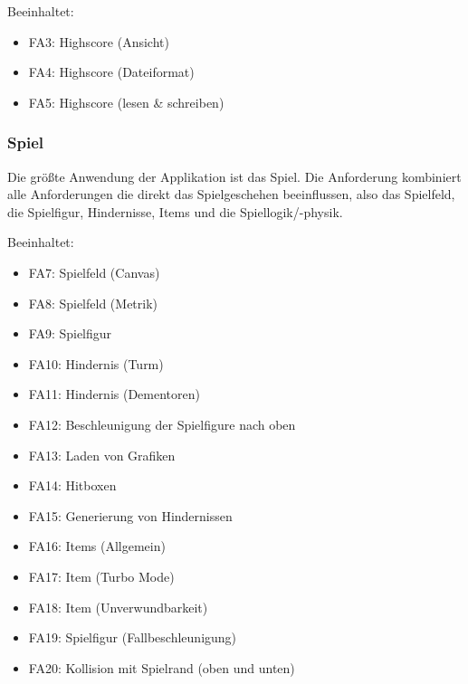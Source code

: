 \documentclass[DIN, pagenumber=false, fontsize=11pt, parskip=half]{scrartcl}
\begin{document}
    Beeinhaltet:
    \begin{itemize}
        \item FA3: Highscore (Ansicht)
        \item FA4: Highscore (Dateiformat)
        \item FA5: Highscore (lesen \& schreiben)
    \end{itemize}
    \subsubsection{Spiel}
    Die größte Anwendung der Applikation ist das Spiel. Die Anforderung kombiniert alle Anforderungen die direkt das Spielgeschehen beeinflussen, also
    das Spielfeld, die Spielfigur, Hindernisse, Items und die Spiellogik/-physik.

    Beeinhaltet:
    \begin{itemize}
        \item FA7: Spielfeld (Canvas)
        \item FA8: Spielfeld (Metrik)
        \item FA9: Spielfigur
        \item FA10: Hindernis (Turm)
        \item FA11: Hindernis (Dementoren)
        \item FA12: Beschleunigung der Spielfigure nach oben
        \item FA13: Laden von Grafiken
        \item FA14: Hitboxen
        \item FA15: Generierung von Hindernissen
        \item FA16: Items (Allgemein)
        \item FA17: Item (Turbo Mode)
        \item FA18: Item (Unverwundbarkeit)
        \item FA19: Spielfigur (Fallbeschleunigung)
        \item FA20: Kollision mit Spielrand (oben und unten)
    \end{itemize}
    
    
\end{document}
